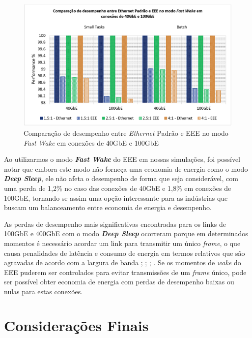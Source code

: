 \begin{figure}[htp]
    \centering
    \includegraphics[width=16cm]{4-EEEHadoop/Image6_EEEPerformance40-100-FastWakeMode.PNG}
    \caption{\centering Comparação de desempenho entre \emph{Ethernet} Padrão e EEE no modo \emph{Fast Wake} em conexões de 40GbE e 100GbE}
    \label{fig:EEEPerformance40-100FastWake}
\end{figure}

Ao utilizarmos o modo \textbf{\emph{Fast Wake}} do EEE em nossas simulações, foi possível notar que embora este modo não forneça uma economia de energia como o modo \textbf{\emph{Deep Sleep}}, ele não afeta o desempenho de forma que seja considerável, com uma perda de 1,2\% no caso das conexões de 40GbE e 1,8\% em conexões de 100GbE, tornando-se assim uma opção interessante para as indústrias que buscam um balanceamento entre economia de energia e desempenho.  

As perdas de desempenho mais significativas encontradas para os links de 100GbE e 400GbE com o modo \textbf{\emph{Deep Sleep}} ocorreram porque em determinados momentos é necessário acordar um link para transmitir um único \emph{frame}, o que causa penalidades de latência e consumo de energia em termos relativos que são agravadas de acordo com a largura de banda \cite{jiang2021modeling}; \cite{reviriego2009performance}; \cite{reviriego2010burst}; \cite{e2017energy}. Se os momentos de \emph{wake} do EEE puderem ser controlados para evitar transmissões de um \emph{frame} único, pode ser possível obter economia de energia com perdas de desempenho baixas ou nulas para estas conexões.

\section{Considerações Finais}

